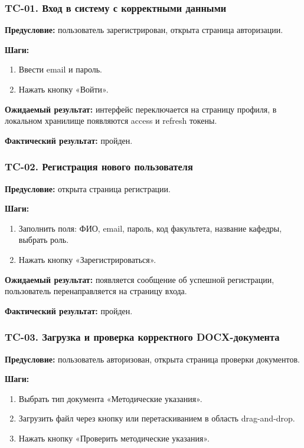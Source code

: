 \subsubsection{TC-01. Вход в систему с корректными данными}

\textbf{Предусловие:} пользователь зарегистрирован, открыта страница авторизации.

\textbf{Шаги:}
\begin{enumerate}
	\item Ввести email и пароль.
	\item Нажать кнопку «Войти».
\end{enumerate}

\textbf{Ожидаемый результат:} интерфейс переключается на страницу профиля, в локальном хранилище появляются access и refresh токены.

\textbf{Фактический результат:} пройден.

\subsubsection{TC-02. Регистрация нового пользователя}

\textbf{Предусловие:} открыта страница регистрации.

\textbf{Шаги:}
\begin{enumerate}
	\item Заполнить поля: ФИО, email, пароль, код факультета, название кафедры, выбрать роль.
	\item Нажать кнопку «Зарегистрироваться».
\end{enumerate}

\textbf{Ожидаемый результат:} появляется сообщение об успешной регистрации, пользователь перенаправляется на страницу входа.

\textbf{Фактический результат:} пройден.

\subsubsection{TC-03. Загрузка и проверка корректного DOCX-документа}

\textbf{Предусловие:} пользователь авторизован, открыта страница проверки документов.

\textbf{Шаги:}
\begin{enumerate}
	\item Выбрать тип документа «Методические указания».
	\item Загрузить файл через кнопку или перетаскиванием в область drag-and-drop.
	\item Нажать кнопку «Проверить методические указания».
\end{enumerate}

